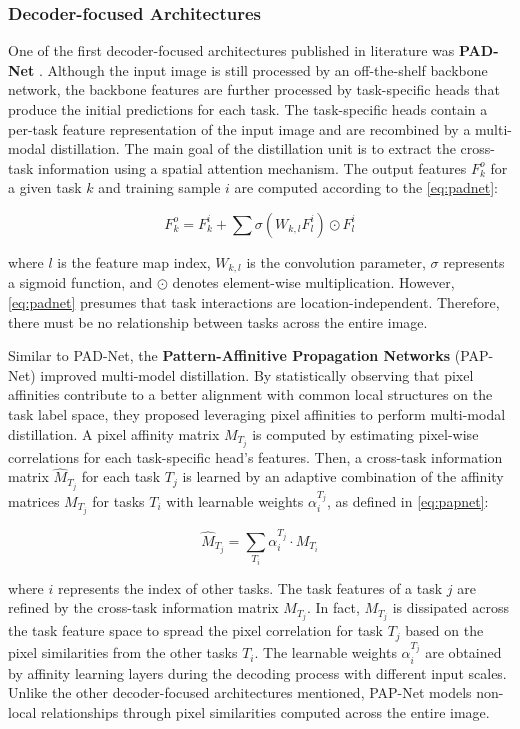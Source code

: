 \subsubsection{Decoder-focused Architectures}
 
One of the first decoder-focused architectures published in literature was \textbf{PAD-Net} \citep{xu2018pad}. Although the input image is still processed by an off-the-shelf backbone network, the backbone features are further processed by task-specific heads that produce the initial predictions for each task. The task-specific heads contain a per-task feature representation of the input image and are recombined by a multi-modal distillation. The main goal of the distillation unit is to extract the cross-task information using a spatial attention mechanism. The output features $F_k^o$ for a given task $k$ and training sample $i$ are computed according to the \autoref{eq:padnet}:
 
\begin{equation}
\label{eq:padnet}
F_k^o = F_k^i + \sum {\sigma (W_{k,l}F_l^i) \odot F_l^i}
\end{equation}
 
\noindent where $l$ is the feature map index, $W_{k,l}$ is the convolution parameter, $\sigma$ represents a sigmoid function, and $\odot$ denotes element-wise multiplication. However, \autoref{eq:padnet} presumes that task interactions are location-independent. Therefore, there must be no relationship between tasks across the entire image.
 
Similar to PAD-Net, the \textbf{Pattern-Affinitive Propagation Networks} (PAP-Net) \citep{zhang2019pattern} improved multi-model distillation. By statistically observing that pixel affinities contribute to a better alignment with common local structures on the task label space, they proposed leveraging pixel affinities to perform multi-modal distillation. A pixel affinity matrix $M_{T_j}$ is computed by estimating pixel-wise correlations for each task-specific head's features. Then, a cross-task information matrix $\hat{M}_{T_j}$ for each task $T_j$ is learned by an adaptive combination of the affinity matrices $M_{T_j}$ for tasks $T_i$ with learnable weights $\alpha_i^{T_j}$, as defined in \autoref{eq:papnet}:
 
\begin{equation}
\label{eq:papnet}
\hat{M}_{T_j} = \sum_{T_i} {\alpha_i^{T_j} \cdot M_{T_i}}
\end{equation}
 
\noindent
where $i$ represents the index of other tasks. The task features of a task $j$ are refined by the cross-task information matrix $M_{T_j}$. In fact, $M_{T_j}$ is dissipated across the task feature space to spread the pixel correlation for task $T_j$ based on the pixel similarities from the other tasks $T_i$. The learnable weights $\alpha_i^{T_j}$ are obtained by affinity learning layers during the decoding process with different input scales. Unlike the other decoder-focused architectures mentioned, PAP-Net models non-local relationships through pixel similarities computed across the entire image.
 
